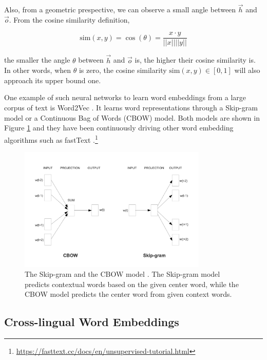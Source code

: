 \documentclass[thesis,fonts=libertine]{cluu}
\begin{document}
Also, from a geometric prespective, we can observe a small angle between $\vec{h}$ and $\vec{o}$. From the cosine similarity definition,

\begin{equation*}
  \text{sim}(x, y) = \cos(\theta) = \frac{x \cdot y}{||x||||y||}
\end{equation*}

\noindent the smaller the angle $\theta$ between $\vec{h}$ and $\vec{o}$ is, the higher their cosine similarity is. In other words, when $\theta$ is zero, the cosine similarity $\text{sim}(x, y) \in [0, 1]$ will also approach its upper bound one.

One example of such neural networks to learn word embeddings from a large corpus of text is Word2Vec \parencite{Mikolov:2013aa,Mikolov:2013ab}. It learns word representations through a Skip-gram model or a Continuous Bag of Words (CBOW) model. Both models are shown in Figure \ref{fig:skip_gram_and_cbow} and they have been continuously driving other word embedding algorithms such as fastText \parencite{Joulin:2018aa}.\footnote{\url{https://fasttext.cc/docs/en/unsupervised-tutorial.html}}

\begin{figure}
  \centering
  \includegraphics[width=0.8\textwidth]{skip_gram_and_cbow_models.png}
  \caption{The Skip-gram and the CBOW model \parencite{Mikolov:2013ac}. The Skip-gram model predicts contextual words based on the given center word, while the CBOW model predicts the center word from given context words.}
  \label{fig:skip_gram_and_cbow}
\end{figure}

\subsection{Cross-lingual Word Embeddings}
\label{sec:multilingual_word_embeddings}
\end{document}

